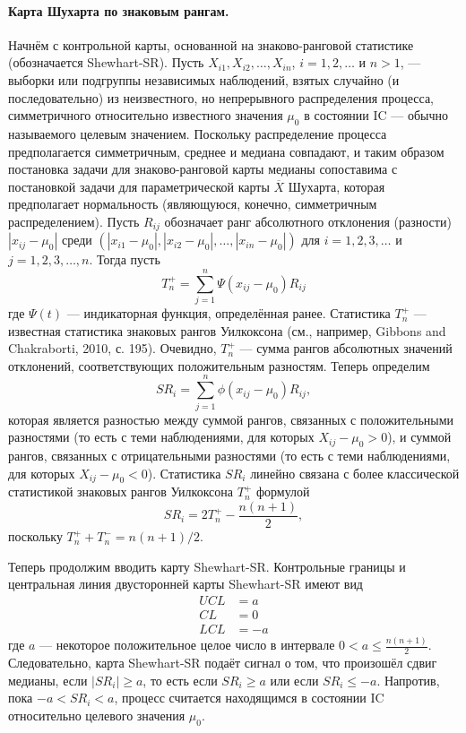 \paragraph{Карта Шухарта по знаковым рангам.} Начнём с контрольной карты, основанной на знаково-ранговой статистике (обозначается Shewhart-SR). Пусть \(X_{i1}, X_{i2}, \ldots, X_{in}\), \(i = 1, 2, \ldots\) и \(n > 1\), --- выборки или подгруппы независимых наблюдений, взятых случайно (и последовательно) из неизвестного, но непрерывного распределения процесса, симметричного относительно известного значения \(\mu_0\) в состоянии IC --- обычно называемого целевым значением. Поскольку распределение процесса предполагается симметричным, среднее и медиана совпадают, и таким образом постановка задачи для знаково-ранговой карты медианы сопоставима с постановкой задачи для параметрической карты \(\overline{X}\) Шухарта, которая предполагает нормальность (являющуюся, конечно, симметричным распределением). Пусть \(R_{ij}\) обозначает ранг абсолютного отклонения (разности) \(|x_{ij} - \mu_0|\) среди \((|x_{i1} - \mu_0|, |x_{i2} - \mu_0|, \ldots, |x_{in} - \mu_0|)\) для \(i = 1, 2, 3, \ldots\) и \(j = 1, 2, 3, \ldots, n\). Тогда пусть
\begin{equation}
	T_n^+ = \sum_{j=1}^{n} \Psi(x_{ij} - \mu_0) R_{ij}
	\label{eq:4.4}
\end{equation}
где \(\Psi(t)\) --- индикаторная функция, определённая ранее. Статистика \(T_n^+\) --- известная статистика знаковых рангов Уилкоксона (см., например, Gibbons and Chakraborti, 2010, с. 195). Очевидно, \(T_n^+\) --- сумма рангов абсолютных значений отклонений, соответствующих положительным разностям. Теперь определим
\begin{equation}
	SR_i = \sum_{j=1}^{n} \phi(x_{ij} - \mu_0) R_{ij},
	\label{eq:4.5}
\end{equation}
которая является разностью между суммой рангов, связанных с положительными разностями (то есть с теми наблюдениями, для которых \(X_{ij} - \mu_0 > 0\)), и суммой рангов, связанных с отрицательными разностями (то есть с теми наблюдениями, для которых \(X_{ij} - \mu_0 < 0\)). Статистика \(SR_i\) линейно связана с более классической статистикой знаковых рангов Уилкоксона \(T_n^+\) формулой
\[
SR_i = 2T_n^+ - \frac{n(n + 1)}{2},
\]
поскольку \(T_n^+ + T_n^- = n(n + 1)/2\).

Теперь продолжим вводить карту Shewhart-SR. Контрольные границы и центральная линия двусторонней карты Shewhart-SR имеют вид
\begin{equation}
	\begin{aligned}
		UCL &= a \\
		CL &= 0 \\
		LCL &= -a
	\end{aligned}
	\label{eq:4.6}
\end{equation}
где \(a\) --- некоторое положительное целое число в интервале \(0 < a \le \frac{n(n + 1)}{2}\). Следовательно, карта Shewhart-SR подаёт сигнал о том, что произошёл сдвиг медианы, если \(|SR_i| \ge a\), то есть если \(SR_i \ge a\) или если \(SR_i \le -a\). Напротив, пока \(-a < SR_i < a\), процесс считается находящимся в состоянии IC относительно целевого значения \(\mu_0\).

